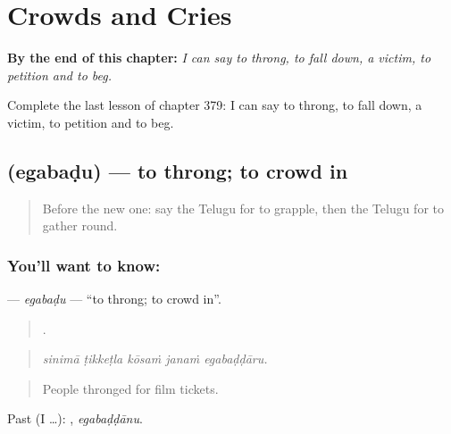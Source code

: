 
\chapter{Crowds and Cries}
\label{ch:te-crowds-and-cries}

\begin{chapteropening}
\textbf{By the end of this chapter:} \emph{I can say to throng, to fall down, a victim, to petition and to beg.}

Complete the last lesson of chapter 379: I can say to throng, to fall down, a victim, to petition and to beg.
\end{chapteropening}

\section[\texorpdfstring{\te{ఎగబడు} (egabaḍu)}{ఎగబడు (egabaḍu)}]{ (egabaḍu) — to throng; to crowd in}

\label{lesson:TE-C379-egabadu}



\begin{quote}
Before the new one: say the Telugu for to grapple, then the Telugu for to gather round.
\end{quote}

\subsection*{You'll want to know: }
\textbf{} — \emph{egabaḍu} — \textquotedblleft{}to throng; to crowd in\textquotedblright{}.

\begin{quote}
    .
\end{quote}

\begin{quote}
\emph{sinimā ṭikkeṭla kōsaṁ janaṁ egabaḍḍāru.}
\end{quote}

\begin{quote}
People thronged for film tickets.
\end{quote}

Past (I …): , \emph{egabaḍḍānu}.

